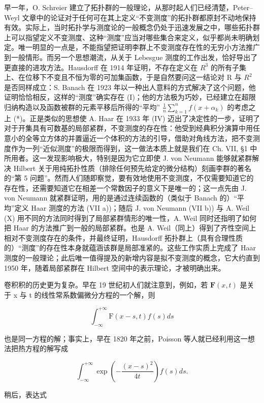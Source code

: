 早一年，O. Schreier 建立了拓扑群的一般理论，从那时起人们已经清楚，Peter--Weyl 文章中的论证对于任何可在其上定义“不变测度”的拓扑群都原封不动地保持有效。实际上，当时拓扑学与测度论的一般概念仍处于迅速发展之中，哪些拓扑群上可以指望定义不变测度、这种“测度”应当对哪些集合来定义，似乎都尚未明确划定。唯一明显的一点是，不能指望把证明李群上不变测度存在性的无穷小方法推广到一般情形。而另一个思想潮流，从关于 Lebesgue 测度的工作出发，恰好导出了更直接的进攻方法。Hausdorff 在 1914 年证明，不存在定义在 \(R^{3}\) 的所有子集上、在位移下不变且不恒为零的可加集函数，于是自然要问这一结论对 R 与 \(R^{2}\) 是否同样成立：S. Banach 在 1923 年以一种出人意料的方式解决了这个问题，他证明恰恰相反，这样的“测度”确实存在 (I)；他的方法极为巧妙，已经建立在超限归纳构造以及函数被群的元素平移后所得的“平均” \(\frac{1}{n}\sum_{k=1}^{n}f(x+\alpha_{k})\) 的考虑之上 (*)。正是类似的思想使 A. Haar 在 1933 年 (IV) 迈出了决定性的一步，证明了对于开集具有可数基的局部紧群，不变测度的存在性：他受到经典积分演算中用任意小的全等立方体的并置逼近一个体积的方法的引导，借助对角线方法，把不变测度作为一列“近似测度”的极限而得到，这一做法本质上就是我们在 Ch. VII, §1 中所用者。这一发现影响极大，特别是因为它立即使 J. von Neumann 能够就紧群解决 Hilbert 关于用纯拓扑性质（排除任何预先给定的微分结构）刻画李群的著名的“第 5 问题”。然而人们随即察觉，要有效地使用不变测度，不仅需要知道它的存在性，还需要知道它在相差一个常数因子的意义下是唯一的；这一点先由 J. von Neumann 就紧群证明，用的是通过连续函数的（类似于 Banach 的）“平均”定义 Haar 测度的方法 (VII a))；随后 J. von Neumann (VII b)) 与 A. Weil (X) 用不同的方法同时得到了局部紧群情形的唯一性，A. Weil 同时还指明了如何把 Haar 的方法推广到一般的局部紧群。也是 A. Weil（同上）得到了齐性空间上相对不变测度存在的条件，并最终证明，Hausdorff 拓扑群上（具有合理性质的）“测度”的存在性本身就蕴涵该群是局部准紧的。这些工作实质上完成了 Haar 测度的一般理论；此后唯一值得提及的新增内容是拟不变测度的概念，它大约直到 1950 年，随着局部紧群在 Hilbert 空间中的表示理论，才被明确出来。

卷积积的历史更为复杂。早在 19 世纪初人们就注意到，例如，若 \(\mathbf{F}(x,t)\) 是关于 x 与 t 的线性常系数偏微分方程的一个解，则

\[
\int_ {- \infty} ^ {+ \infty} \mathrm{F} (x - s, t) f (s) d s
\]

也是同一方程的解；事实上，早在 1820 年之前，Poisson 等人就已经利用这一想法把热方程的解写成

\[
\int_ {- \infty} ^ {+ \infty} \exp \left(- \frac {(x - s) ^ {2}}{4 t}\right) f (s) d s.\tag{1}
\]

稍后，表达式

